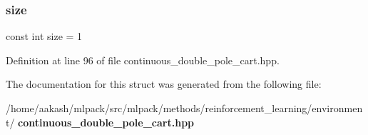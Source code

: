 \mbox{\label{structmlpack_1_1rl_1_1ContinuousDoublePoleCart_1_1Action_aab938108caad0d0e47d6885b5ba2d23a}} 
\subsubsection{size}
{\footnotesize\ttfamily const int size = 1}



Definition at line 96 of file continuous\+\_\+double\+\_\+pole\+\_\+cart.\+hpp.



The documentation for this struct was generated from the following file\+:\begin{DoxyCompactItemize}
\item 
/home/aakash/mlpack/src/mlpack/methods/reinforcement\+\_\+learning/environment/\textbf{ continuous\+\_\+double\+\_\+pole\+\_\+cart.\+hpp}\end{DoxyCompactItemize}
